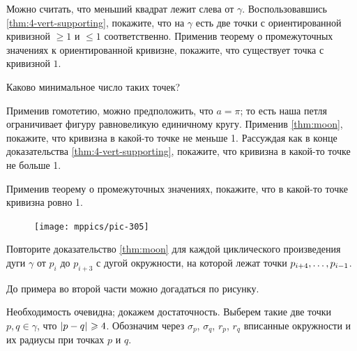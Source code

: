 \begin{multicols}{2}
Можно считать, что меньший квадрат лежит слева от $\gamma$.
Воспользовавшись \ref{thm:4-vert-supporting}, покажите, что на $\gamma$ есть две точки с ориентированной кривизной $\ge 1$ и $\le 1$ соответственно.
Применив теорему о промежуточных значениях к ориентированной кривизне, покажите, что существует точка с кривизной $1$.

 Каково минимальное число таких точек?

Применив гомотетию, можно предположить, что $a=\pi$; то есть наша петля ограничивает фигуру равновеликую единичному кругу.
Применив \ref{thm:moon}, покажите, что кривизна в какой-то точке не меньше 1.
Рассуждая как в конце доказательства \ref{thm:4-vert-supporting}, покажите, что кривизна в какой-то точке не больше 1.

Применив теорему о промежуточных значениях, покажите, что в какой-то точке кривизна ровно 1.

\begin{figure}
\vskip-6mm
\centering
\texttt{[image: mppics/pic-305]}
\vskip-2mm
\end{figure}

Повторите доказательство \ref{thm:moon} для каждой циклического произведения дуги $\gamma$ от $p_i$ до $p_{i+3}$ с дугой окружности, на которой лежат точки $p_{i+4},\z\dots,p_{i-1}$.

До примера во второй части можно догадаться по рисунку.






Необходимость очевидна; докажем достаточность.
Выберем такие две точки $p,q\in\gamma$, что $\dist{p}{q}{}\ge 4$.
Обозначим через $\sigma_p$, $\sigma_q$, $r_p$, $r_q$ вписанные окружности и их радиусы при точках $p$ и $q$.


\end{multicols}
